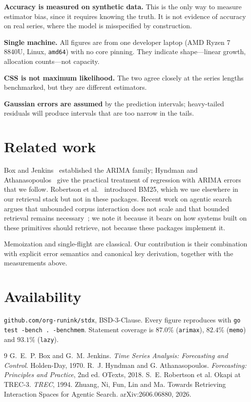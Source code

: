 \documentclass[10pt,twocolumn]{article}
\begin{document}
\textbf{Accuracy is measured on synthetic data.} This is the only way to measure
estimator bias, since it requires knowing the truth. It is not evidence of
accuracy on real series, where the model is misspecified by construction.

\textbf{Single machine.} All figures are from one developer laptop
(AMD Ryzen 7 8840U, Linux, \texttt{amd64}) with no core pinning. They indicate
shape---linear growth, allocation counts---not capacity.

\textbf{CSS is not maximum likelihood.} The two agree closely at the series
lengths benchmarked, but they are different estimators.

\textbf{Gaussian errors are assumed} by the prediction intervals; heavy-tailed
residuals will produce intervals that are too narrow in the tails.

\section{Related work}

Box and Jenkins~\cite{boxjenkins} established the ARIMA family; Hyndman and
Athanasopoulos~\cite{hyndman} give the practical treatment of regression with
ARIMA errors that we follow. Robertson et al.~\cite{bm25} introduced BM25, which
we use elsewhere in our retrieval stack but not in these packages. Recent work on
agentic search argues that unbounded corpus interaction does not scale and that
bounded retrieval remains necessary~\cite{rise}; we note it because it bears on
how systems built on these primitives should retrieve, not because these packages
implement it.

Memoization and single-flight are classical. Our contribution is their
combination with explicit error semantics and canonical key derivation, together
with the measurements above.

\section{Availability}

\texttt{github.com/org-runink/stdx}, BSD-3-Clause. Every figure reproduces with
\texttt{go test -bench . -benchmem}. Statement coverage is $87.0\%$
(\texttt{arimax}), $82.4\%$ (\texttt{memo}) and $93.1\%$ (\texttt{lazy}).

\begin{thebibliography}{9}
 G.~E.~P. Box and G.~M. Jenkins. \emph{Time Series Analysis:
Forecasting and Control}. Holden-Day, 1970.
 R.~J. Hyndman and G. Athanasopoulos. \emph{Forecasting:
Principles and Practice}, 2nd ed. OTexts, 2018.
 S.~E. Robertson et al. Okapi at TREC-3. \emph{TREC}, 1994.
 Zhuang, Ni, Fun, Lin and Ma. Towards Retrieving Interaction Spaces
for Agentic Search. arXiv:2606.06880, 2026.
\end{thebibliography}
\end{document}
